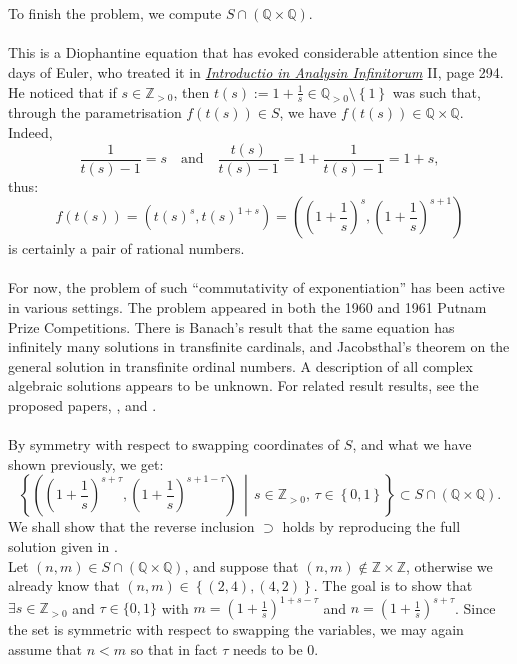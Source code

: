 \documentclass[11pt, a4paper, oneside]{article}
\theoremstyle{remark}
\theoremstyle{lemma}
\begin{document}
\\\\
To finish the problem, we compute \( S \cap \left( \mathbb{Q} \times \mathbb{Q} \right) \).
\\\\
This is a Diophantine equation that has evoked considerable attention since the days of Euler, who treated it in \href{https://en.wikipedia.org/wiki/Introductio_in_analysin_infinitorum}{\textit{Introductio in Analysin Infinitorum}} II, page 294. He noticed that if \( s \in \mathbb{Z}_{>0} \), then \( t(s) := 1 + \frac{1}{s} \in \mathbb{Q}_{>0} \setminus \left\{ 1 \right\} \) was such that, through the parametrisation \( f\left( t(s) \right) \in S \), we have \( f\left( t(s) \right) \in \mathbb{Q} \times \mathbb{Q} \). Indeed,
\[
\frac{1}{t(s) - 1} = s \quad \text{and} \quad \frac{t(s)}{t(s) - 1} = 1 + \frac{1}{t(s) - 1} = 1 + s,
\]
thus:
\[
f\left( t(s) \right) = \left( t(s)^{s}, t(s)^{1 + s} \right) = \left( \left(1 + \frac{1}{s} \right)^{s}, \left(1 + \frac{1}{s} \right)^{s + 1} \right)
\]
is certainly a pair of rational numbers.
\\\\
For now, the problem of such “commutativity of exponentiation” has been active in various settings. The problem appeared in both the 1960 and 1961 Putnam Prize Competitions. There is Banach's result that the same equation has infinitely many solutions in transfinite cardinals, and Jacobsthal's theorem on the general solution in transfinite ordinal numbers. A description of all complex algebraic solutions appears to be unknown. For related result results, see the proposed papers, \cite{bennett2002reznick}, and \cite{alvin1961hausner}.
\\\\
By symmetry with respect to swapping coordinates of \( S \), and what we have shown previously, we get:
\[
\left\{ \left( \left(1 + \frac{1}{s} \right)^{s+\tau}, \left(1 + \frac{1}{s} \right)^{s + 1-\tau} \right) \,\middle|\, s \in \mathbb{Z}_{>0},\, \tau \in \left\{ 0, 1 \right\} \right\} \subset S \cap \left( \mathbb{Q} \times \mathbb{Q} \right).
\]
We shall show that the reverse inclusion \( \supset \) holds by reproducing the full solution given in \cite{solomon1967Hurwitz}.
\\
Let \( \left( n, m \right) \in S \cap \left( \mathbb{Q} \times \mathbb{Q} \right) \), and suppose that \( \left(n, m\right) \notin \mathbb{Z} \times \mathbb{Z} \), otherwise we already know that \( \left(n, m\right) \in \left\{ (2, 4), (4, 2) \right\} \). The goal is to show that \( \exists s \in \mathbb{Z}_{>0} \) and $\tau\in\{0,1\}$ with \( m = \left(1 + \frac{1}{s} \right)^{1+s-\tau} \) and \( n = \left(1 + \frac{1}{s} \right)^{s+\tau} \). Since the set is symmetric with respect to swapping the variables, we may again assume that \( n < m \) so that in fact $\tau$ needs to be $0$.
\end{document}
